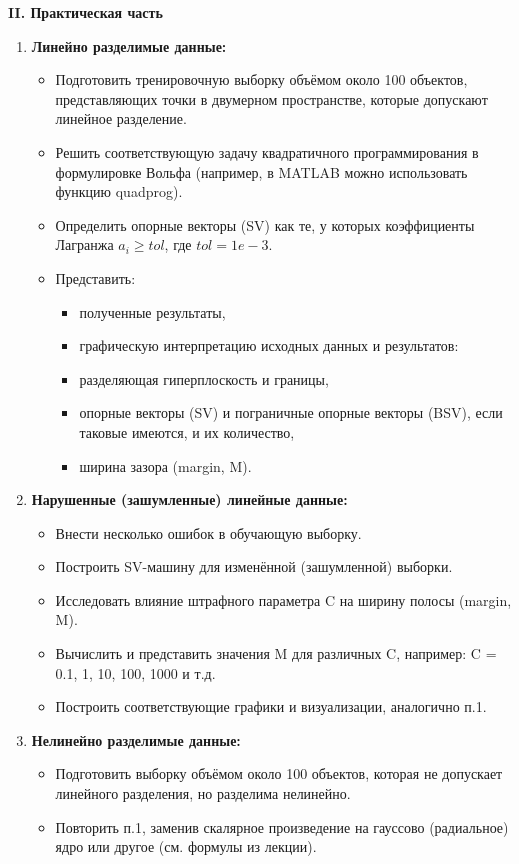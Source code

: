 \textbf{II. Практическая часть}
\begin{enumerate}
\item \textbf{Линейно разделимые данные:}
\begin{itemize}
\item Подготовить тренировочную выборку объёмом около 100 объектов,
представляющих точки в двумерном пространстве, которые допускают
линейное разделение.
\item Решить соответствующую задачу квадратичного программирования в
формулировке Вольфа (например, в MATLAB можно использовать функцию
quadprog).
\item Определить опорные векторы (SV) как те, у которых коэффициенты
Лагранжа $a_i \geq tol$, где $ tol = 1e - 3$.
\item Представить:
\begin{itemize}
\item полученные результаты,
\item графическую интерпретацию исходных данных и результатов:
\item разделяющая гиперплоскость и границы,
\item опорные векторы (SV) и пограничные опорные векторы
(BSV), если таковые имеются, и их количество,
\item ширина зазора (margin, M).
\end{itemize}
\end{itemize}
\item \textbf{Нарушенные (зашумленные) линейные данные:}
\begin{itemize}
\item Внести несколько ошибок в обучающую выборку.
\item Построить SV-машину для изменённой (зашумленной) выборки.
\item Исследовать влияние штрафного параметра C на ширину полосы (margin,
M).
\item Вычислить и представить значения M для различных C, например:
C = 0.1, 1, 10, 100, 1000 и т.д.
\item Построить соответствующие графики и визуализации, аналогично п.1.
\end{itemize}
\item \textbf{Нелинейно разделимые данные:}
\begin{itemize}
\item Подготовить выборку объёмом около 100 объектов, которая не допускает
линейного разделения, но разделима нелинейно.
\item Повторить п.1, заменив скалярное произведение на гауссово (радиальное) ядро или другое (см. формулы из лекции).

\end{itemize}
\end{enumerate}
